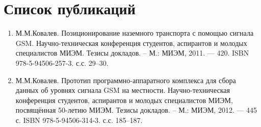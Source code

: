 \chapter*{Список публикаций}
\label{chap:publications}
\begin{enumerate}
	\item
		М.М.Ковалев. Позиционирование наземного транспорта с помощью сигнала GSM. Научно-техническая конференция студентов, аспирантов и молодых специалистов МИЭМ. Тезисы докладов. -- М.: МИЭМ, 2011. --- 420. ISBN 978-5-94506-257-3. с.с. 29--30.
	\item
		М.М.Ковалев. Прототип программно-аппаратного комплекса для сбора данных об уровнях сигнала GSM на местности. Научно-техническая конференция студентов, аспирантов и молодых специалистов МИЭМ, посвящённая 50-летию МИЭМ. Тезисы докладов. -- М.: МИЭМ, 2012. --- 445 с. ISBN 978-5-94506-314-3. с.с. 185--187.
\end{enumerate}
